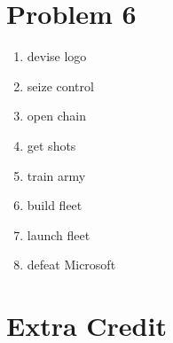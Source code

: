 \documentclass[11pt]{article}
\begin{document}
\section*{Problem 6}
	\begin{enumerate}[1)]
	\item	devise logo
	\item	seize control
	\item	open chain
	\item	get shots
	\item	train army
	\item	build fleet
	\item	launch fleet
	\item	defeat Microsoft
	\end{enumerate}

\section*{Extra Credit}
\end{document}
